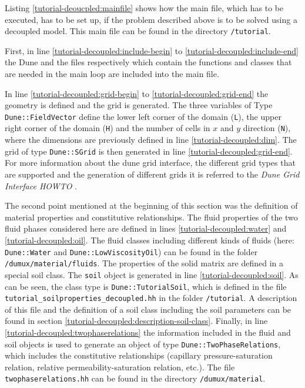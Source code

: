 Listing \ref{tutorial-deoucpled:mainfile} shows how the main file, which has to be executed, has to be set up, if the problem described above is to be solved using a decoupled model. This main file can be found in the directory \texttt{/tutorial}.

\begin{lst}\label{tutorial-deoucpled:mainfile} \mbox{}

\end{lst}

First, in line \ref{tutorial-decoupled:include-begin} to \ref{tutorial-decoupled:include-end} the Dune and the \Dumux files respectively which contain the functions and classes that are needed in the main loop are included into the main file.

In line \ref{tutorial-decoupled:grid-begin} to \ref{tutorial-decoupled:grid-end} the geometry is defined and the grid is generated. The three variables of Type \texttt{Dune::FieldVector} define the lower left corner of the domain (\texttt{L}), the upper right corner of the domain (\texttt{H}) and the number of cells in $x$ and $y$ direction (\texttt{N}), where the dimensions are previously defined in line \ref{tutorial-decoupled:dim}. The grid of type \texttt{Dune::SGrid} is then generated in line \ref{tutorial-decoupled:grid-end}. For more information about the dune grid interface, the different grid types that are supported and the generation of different grids it is referred to the \textit{Dune Grid Interface HOWTO} \cite{DUNE-HP}.

The second point mentioned at the beginning of this section was the
definition of material properties and constitutive relationships. The
fluid properties of the two fluid phases considered here are defined
in lines \ref{tutorial-decoupled:water} and
\ref{tutorial-decoupled:oil}. The fluid classes including different
kinds of fluids (here: \texttt{Dune::Water} and \texttt{Dune::LowViscosityOil})
can be found in the folder \texttt{/dumux/material/fluids}. The
properties of the solid matrix are defined in a special soil
class. The \texttt{soil} object is generated in line
\ref{tutorial-decoupled:soil}. As can be seen, the class type is
\texttt{Dune::TutorialSoil}, which is defined in the file
\texttt{tutorial\_soilproperties\_decoupled.hh} in the folder
\texttt{/tutorial}. A description of this file and the definition of a
soil class including the soil parameters can be found in section
\ref{tutorial-decoupled:description-soil-class}. Finally, in line
\ref{tutorial-decoupled:twophaserelations} the information included in
the fluid and soil objects is used to generate an object of type
\texttt{Dune::TwoPhaseRelations}, which includes the constitutive
relationships (capillary pressure-saturation relation, relative
permeability-saturation relation, etc.). The file
\texttt{twophaserelations.hh} can be found in the directory
\texttt{/dumux/material}.

